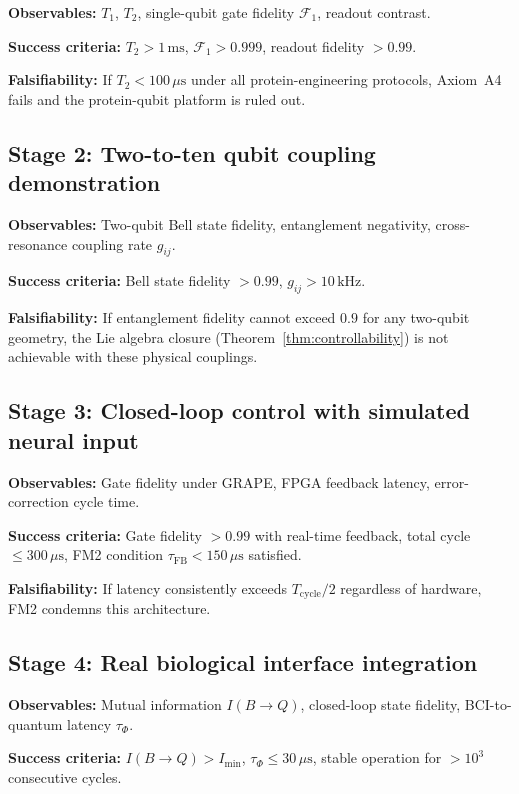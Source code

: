 \textbf{Observables:} $T_1$, $T_2$, single-qubit gate fidelity
$\mathcal{F}_1$, readout contrast.

\textbf{Success criteria:} $T_2 > 1\,\text{ms}$, $\mathcal{F}_1 > 0.999$,
readout fidelity $> 0.99$.

\textbf{Falsifiability:} If $T_2 < 100\,\mu\text{s}$ under all
protein-engineering protocols, Axiom~A4 fails and the protein-qubit
platform is ruled out.

\subsection{Stage 2: Two-to-ten qubit coupling demonstration}

\textbf{Observables:} Two-qubit Bell state fidelity, entanglement
negativity, cross-resonance coupling rate $g_{ij}$.

\textbf{Success criteria:} Bell state fidelity $> 0.99$, $g_{ij} >
10\,\text{kHz}$.

\textbf{Falsifiability:} If entanglement fidelity cannot exceed
$0.9$ for any two-qubit geometry, the Lie algebra closure
(Theorem~\ref{thm:controllability}) is not achievable with these
physical couplings.

\subsection{Stage 3: Closed-loop control with simulated neural input}

\textbf{Observables:} Gate fidelity under GRAPE, FPGA feedback latency,
error-correction cycle time.

\textbf{Success criteria:} Gate fidelity $> 0.99$ with real-time
feedback, total cycle $\leq 300\,\mu\text{s}$, FM2 condition
$\tau_{\mathrm{FB}} < 150\,\mu\text{s}$ satisfied.

\textbf{Falsifiability:} If latency consistently exceeds
$T_{\mathrm{cycle}}/2$ regardless of hardware, FM2 condemns
this architecture.

\subsection{Stage 4: Real biological interface integration}

\textbf{Observables:} Mutual information $I(B \to Q)$, closed-loop
state fidelity, BCI-to-quantum latency $\tau_\Phi$.

\textbf{Success criteria:} $I(B \to Q) > I_{\mathrm{min}}$,
$\tau_\Phi \leq 30\,\mu\text{s}$, stable operation for $> 10^3$
consecutive cycles.

